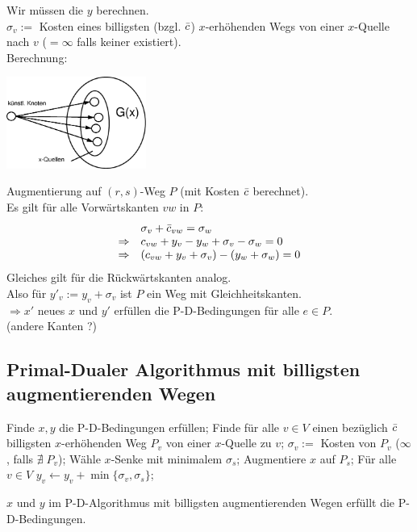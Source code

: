 Wir müssen die $y$ berechnen.\\
$\sigma_{v} := $ Kosten eines billigsten (bzgl. $\bar{c}$) $x$-erhöhenden Wegs
von einer $x$-Quelle nach $v$ ($=\infty$ falls keiner existiert).\\
Berechnung:

\includegraphics[height=3cm]{bilder/4-3BerechnY}

Augmentierung auf $(r,s)$-Weg $P$ (mit Kosten $\bar{c}$ berechnet).\\
Es gilt für alle Vorwärtskanten $v w$ in $P$:
\[\begin{array}{ll}
&\sigma_{v} + \bar{c}_{v w} = \sigma_{w}\\
\Rightarrow&c_{v w} + y_{v} - y_{w} + \sigma_{v} - \sigma_{w} = 0\\
\Rightarrow& (c_{v w} + y_{v} + \sigma_{v}) - (y_{w} + \sigma_{w}) = 0
\end{array}\]
Gleiches gilt für die Rückwärtskanten analog.\\
Also für $y'_v := y_{v} + \sigma_{v}$ ist $P$ ein Weg mit
Gleichheitskanten.\\
$\Rightarrow x'$ neues $x$  und $y'$ erfüllen die P-D-Bedingungen für alle
$e \in P$.\\
(andere Kanten ?) 

\subsection{Primal-Dualer Algorithmus mit billigsten augmentierenden Wegen}
\begin{algorithmic}
\STATE Finde $x,y$ die P-D-Bedingungen erfüllen;
\STATE Finde für alle $v\in V$ einen bezüglich $\bar{c}$ billigsten
$x$-erhöhenden Weg $P_{v}$ von einer $x$-Quelle zu $v$;
\STATE $\sigma_{v} := $ Kosten von $P_{v}$ ($\infty$, falls $\nexists
\; P_{v}$);
\STATE Wähle $x$-Senke mit minimalem $\sigma_{s}$;
\STATE Augmentiere $x$ auf $P_{s}$;
\STATE Für alle $v\in V$ $y_{v} \leftarrow y_{v} + \min\{\sigma_{v},
\sigma_{s}\}$;
\ENDWHILE
\end{algorithmic}

\begin{lemma}
$x$ und $y$ im P-D-Algorithmus mit billigsten augmentierenden Wegen erfüllt
die P-D-Bedingungen.
\end{lemma}

